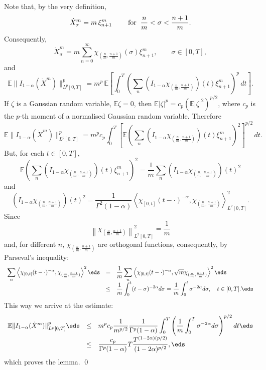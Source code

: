 \documentclass[preprint]{imsart}
\def\E{\mathbb E}
\def\ds{\displaystyle}
\begin{document}
{Note that, by the very definition,
$$
\dot{X}^m_\sigma =m\, \xi^m_{n+1}
\qquad {\rm \; for\;\;} \frac{n}{m}<\sigma <\frac{n+1}{m}.
$$
Consequently,
$$
\dot{X}^m_\sigma =m\sum_{n=0}^\infty
\chi_{(\frac{n}{m},\frac{n+1}{m})}(\sigma)
\xi^m_{n+1},
\qquad  \sigma \in [0,T],
$$
and
$$
\E \| I_{1-\alpha } (\dot{X}^m)\|_{L^p[0,T]}^p=
m^p \, \E\left[
\int_0^T\left(
\sum_n (
 I_{1-\alpha } \chi_{(\frac{n}{m},\frac{n+1}{m})}
 )(t)\xi^m_{n+1}
 \right)^p
 \, dt\right].
 $$
If $\zeta$ is a Gaussian random variable, $\E\zeta =0$,
then $\E |\zeta |^p =c_p (\E |\zeta |^2)^{p/2}$, where
$c_p$ is the $p$-th moment of a normalised Gaussian
random variable. Therefore
$$
\E \| I_{1-\alpha } (\dot{X}^m)\|_{L^p[0,T]}^p=
m^p c_p \int_0^T \left[ \E
\left(
\sum_n (
 I_{1-\alpha } \chi_{(\frac{n}{m},\frac{n+1}{m})}
 )(t)\xi^m_{n+1}
 \right)^2
 \right]^{p/2} \, dt.
 $$
But, for each $t\in [0,T]$,
$$
\E
\left(
\sum_n (
 I_{1-\alpha } \chi_{(\frac{n}{m},\frac{n+1}{m})}
 )(t)\xi^m_{n+1}
 \right)^2=
 \frac{1}{m} \sum_n (
 I_{1-\alpha } \chi_{(\frac{n}{m},\frac{n+1}{m})}
 )(t)^2
$$
and
$$
(
 I_{1-\alpha } \chi_{(\frac{n}{m},\frac{n+1}{m})}
 )(t)^2 = \frac{1}{\Gamma^2(1-\alpha)}
 \left< \chi_{[0,t]}(t-\cdot)^{-\alpha},
 \chi_{(\frac{n}{m},\frac{n+1}{m})}
 \right>^2_{L^2[0,T]}.
$$
Since
$$
 \left\|\chi_{(\frac{n}{m},\frac{n+1}{m})}
 \right\| ^2_{L^2[0,T]} =\frac{1}{m}
$$
and, for different $n$,
$\chi_{(\frac{n}{m},\frac{n+1}{m})}$ are orthogonal
functions, consequently, by Parseval's inequality:
$$
  \begin{array}{lll}
    \ds
    \sum_n  \left< \chi_{[0,t]}(t-\cdot)^{-\alpha},
 \chi_{(\frac{n}{m},\frac{n+1}{m})}

 \right>^2
 \eds &=& \ds
\frac{1}{m} \sum_n
\left< \chi_{[0,t]}(t-\cdot)^{-\alpha},
 \sqrt{m}\chi_{(\frac{n}{m},\frac{n+1}{m})}
 \right>^2
 \eds \\
    &\leq & \ds
\frac{1}{m} \int_0^t(t-\sigma)^{-2\alpha}d\sigma =
\frac{1}{m} \int_0^t \sigma^{-2\alpha}d\sigma,
\quad t\in [0,T].
\eds
  \end{array}
$$
This way we arrive at the estimate:
$$
  \begin{array}{lll}
    \ds \E \| I_{1-\alpha } (\dot{X}^m)\|_{L^p[0,T]}^p\eds
  &  \leq & \ds
  m^p c_p \frac{1}{m^{p/2}}\frac{1}{\Gamma^p(1-\alpha)}
  \int_0^T\left( \frac{1}{m}
  \int_0^T  \sigma^{-2\alpha}d\sigma\right)^{p/2}dt\eds
  \\
    &\leq & \ds
\frac{c_p}{\Gamma^p(1-\alpha)} T
\frac{T^{(1-2\alpha){(p/2)}}}
{ (1-2\alpha)^{p/2}},
\eds
  \end{array}
$$
which proves the lemma. \qed



}
\end{document}
